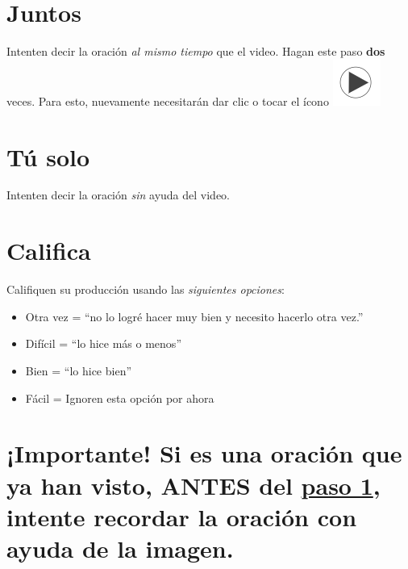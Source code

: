 \documentclass[
]{book}
\begin{document}
\hypertarget{juntos}{%
\section{Juntos}\label{juntos}}

Intenten decir la oración \emph{al mismo tiempo} que el video. Hagan este paso \textbf{dos} veces. Para esto, nuevamente necesitarán dar clic o tocar el ícono \includegraphics{images/play_icon.png}

\hypertarget{tuxfa-solo}{%
\section{Tú solo}\label{tuxfa-solo}}

Intenten decir la oración \emph{sin} ayuda del video.

\hypertarget{califica}{%
\section{Califica}\label{califica}}

Califiquen su producción usando las \emph{siguientes opciones}:

\begin{itemize}
\item
  Otra vez = ``no lo logré hacer muy bien y necesito hacerlo otra vez.''
\item
  Difícil = ``lo hice más o menos''
\item
  Bien = ``lo hice bien''
\item
  Fácil = Ignoren esta opción por ahora
\end{itemize}

\hypertarget{importante-si-es-una-oraciuxf3n-que-ya-han-visto-antes-del-paso-1-intente-recordar-la-oraciuxf3n-con-ayuda-de-la-imagen.}{%
\section{\texorpdfstring{¡Importante! Si es una oración que \textbf{ya} han visto, ANTES del \protect\hyperlink{cross_2}{paso 1}, intente recordar la oración con ayuda de la imagen.}{¡Importante! Si es una oración que ya han visto, ANTES del paso 1, intente recordar la oración con ayuda de la imagen.}}\label{importante-si-es-una-oraciuxf3n-que-ya-han-visto-antes-del-paso-1-intente-recordar-la-oraciuxf3n-con-ayuda-de-la-imagen.}}
\end{document}
